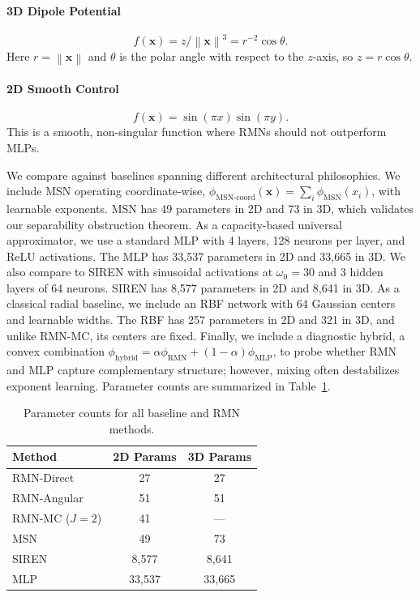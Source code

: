 \documentclass[twoside,11pt]{article}
\newcommand{\bx}{\bm{x}}
\newcommand{\norm}[1]{\left\|#1\right\|}
\begin{document}
\paragraph{3D Dipole Potential}
\begin{equation}
	f(\bx) = z/\norm{\bx}^3 = r^{-2} \cos\theta.
\end{equation}
Here $r = \norm{\bx}$ and $\theta$ is the polar angle with respect to the $z$-axis, so $z = r\cos\theta$.

\paragraph{2D Smooth Control}
\begin{equation}
	f(\bx) = \sin(\pi x) \sin(\pi y).
\end{equation}
This is a smooth, non-singular function where RMNs should not outperform MLPs.

\label{par:baselines}
We compare against baselines spanning different architectural philosophies. We include MSN operating coordinate-wise, $\phi_{\text{MSN-coord}}(\bx) = \sum_i \phi_{\text{MSN}}(x_i)$, with learnable exponents. MSN has 49 parameters in 2D and 73 in 3D, which validates our separability obstruction theorem. As a capacity-based universal approximator, we use a standard MLP with 4 layers, 128 neurons per layer, and ReLU activations. The MLP has 33,537 parameters in 2D and 33,665 in 3D. We also compare to SIREN \citep{sitzmann2020siren} with sinusoidal activations at $\omega_0 = 30$ and 3 hidden layers of 64 neurons. SIREN has 8,577 parameters in 2D and 8,641 in 3D. As a classical radial baseline, we include an RBF network with 64 Gaussian centers and learnable widths. The RBF has 257 parameters in 2D and 321 in 3D, and unlike RMN-MC, its centers are fixed. Finally, we include a diagnostic hybrid, a convex combination $\phi_{\text{hybrid}} = \alpha \phi_{\text{RMN}} + (1-\alpha) \phi_{\text{MLP}}$, to probe whether RMN and MLP capture complementary structure; however, mixing often destabilizes exponent learning. Parameter counts are summarized in Table~\ref{tab:baseline_params}.

\begin{table}[t]
	\centering
	\begin{tabular}{lcc}
		\toprule
		Method       & 2D Params & 3D Params \\
		\midrule
		RMN-Direct   & 27        & 27        \\
		RMN-Angular  & 51        & 51        \\
		RMN-MC ($J=2$) & 41        & ---       \\
		MSN          & 49        & 73        \\
		SIREN        & 8,577     & 8,641     \\
		MLP          & 33,537    & 33,665    \\
		\bottomrule
	\end{tabular}
	\caption{Parameter counts for all baseline and RMN methods.}
	\label{tab:baseline_params}
\end{table}
\end{document}

